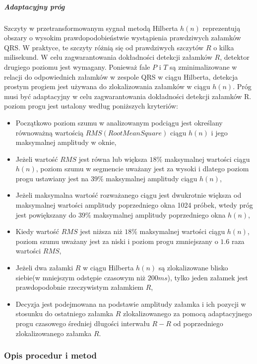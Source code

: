 \documentclass[a4paper, 11pt]{article}
\begin{document}
\subparagraph{Adaptacyjny próg}
Szczyty w przetransformowanym sygnał metodą Hilberta $h(n)$ reprezentują obszary o wysokim prawdopodobieństwie wystąpienia prawdziwych załamków QRS. W praktyce, te szczyty różnią się od prawdziwych szczytów $R$ o kilka milisekund. W celu zagwarantowania dokładności detekcji załamków $R$, detektor drugiego poziomu jest wymagany. Ponieważ fale $P$ i $T$ są zminimalizowane w relacji do odpowiednich załamków w zespole QRS w ciągu Hilberta, detekcja prostym progiem jest używana do zlokalizowania załamków w ciągu $h(n)$. Próg musi być adaptacyjny w celu zagwarantowania dokładności detekcji załamków R.\\
poziom progu jest ustalony według poniższych kryteriów:
\begin{itemize}
		\item Początkowo poziom szumu w analizowanym podciągu jest określany równoważną wartością $RMS(Root Mean Square)$ ciągu $h(n)$ i jego maksymalnej amplitudy w oknie, 
		\item Jeżeli wartość $RMS$ jest równa lub większa $18\%$ maksymalnej wartości ciągu $h(n)$, poziom szumu w segmencie uważany jest za wysoki i dlatego poziom progu ustawiany jest na $39\%$ maksymalnej amplitudy ciągu $h(n)$,  
		\item Jeżeli maksymalna wartość rozważanego ciągu jest dwukrotnie większa od maksymalnej wartości amplitudy poprzedniego okna 1024 próbek, wtedy próg jest powiększany do $39\%$ maksymalnej amplitudy poprzedniego okna $h(n)$, 
		\item Kiedy wartość $RMS$ jest niższa niż $18\%$ maksymalnej wartości ciągu $h(n)$, poziom szumu uważany jest za niski i poziom progu zmniejszany o $1.6$ raza wartości $RMS$,
		\item Jeżeli dwa załamki $R$ w ciągu Hilberta $h(n)$ są zlokalizowane blisko siebie(w mniejszym odstępie czasowym niż $200ms$), tylko jeden załamek jest prawdopodobnie rzeczywistym załamkiem $R$,
		\item Decyzja jest podejmowana na podstawie amplitudy załamka i ich pozycji w stosunku do ostatniego załamka $R$ zlokalizowanego za pomocą adaptacyjnego progu czasowego średniej długości interwału $R-R$ od poprzedniego zlokalizowanego załamka $R$.
\end{itemize}

\subsubsection{Opis procedur i metod}
\label{sec:rs:procs}
\end{document}
